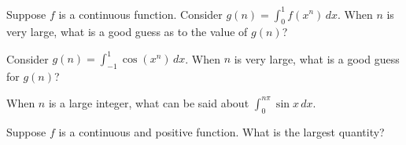 \documentclass{ximera}
\begin{document}
\begin{shuffle}
\begin{problem}
  Suppose $f$ is a continuous function.  Consider $g(n) = \int_0^1 f(x^n) \, dx$.  When $n$ is very large, what is a good guess as to the value of $g(n)$?
  \begin{multipleChoice}
  \end{multipleChoice}
\end{problem}

\begin{problem}
  Consider $g(n) = \int_{-1}^1 \cos(x^n) \, dx$.  When $n$ is very large, what is a good guess for $g(n)$?
  \begin{multipleChoice}
  \end{multipleChoice}
\end{problem}



\begin{problem}
  When $n$ is a large integer, what can be said about $\int_0^{n \pi} \sin x \, dx$.
  \begin{multipleChoice}
  \end{multipleChoice}
\end{problem}




\begin{problem}
  Suppose $f$ is a continuous and positive function.  What is the largest quantity?
  \begin{multipleChoice}
  \end{multipleChoice}
\end{problem}



\end{shuffle}
\end{document}
